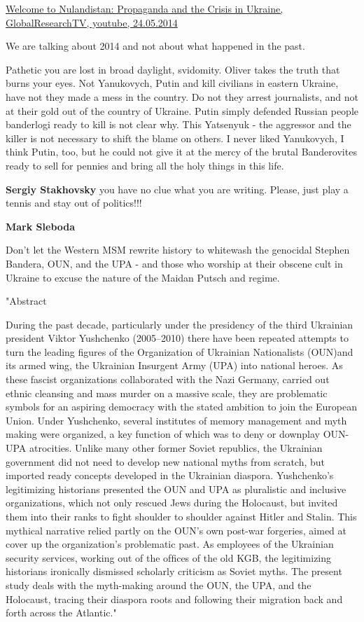 \begin{itemize}
\begin{itemize}
\href{https://www.youtube.com/watch?v=yu8KTiLsLJw}{%
Welcome to Nulandistan: Propaganda and the Crisis in Ukraine, GlobalResearchTV, youtube, 24.05.2014
}

We are talking about
2014 and not about what happened in the past.


Pathetic you are lost in broad daylight, svidomity. Oliver takes the truth that
burns your eyes. Not Yanukovych, Putin and kill civilians in eastern Ukraine,
have not they made a mess in the country. Do not they arrest journalists, and
not at their gold out of the country of Ukraine. Putin simply defended Russian
people banderlogi ready to kill is not clear why. This Yatsenyuk - the
aggressor and the killer is not necessary to shift the blame on others. I never
liked Yanukovych, I think Putin, too, but he could not give it at the mercy of
the brutal Banderovites ready to sell for pennies and bring all the holy things
in this life.

\textbf{Sergiy Stakhovsky} you have no clue what you are writing. Please, just play a tennis and stay out of politics!!!

\textbf{Mark Sleboda}

Don't let the Western MSM rewrite history to whitewash the genocidal Stephen
Bandera, OUN, and the UPA - and those who worship at their obscene cult in
Ukraine to excuse the nature of the Maidan Putsch and regime.

"Abstract

During the past decade, particularly under the presidency of the third
Ukrainian president Viktor Yushchenko (2005–2010) there have been repeated
attempts to turn the leading ﬁgures of the Organization of Ukrainian
Nationalists (OUN)and its armed wing, the Ukrainian Insurgent Army (UPA) into
national heroes. As these fascist organizations collaborated with the Nazi
Germany, carried out ethnic cleansing and mass murder on a massive scale, they
are problematic symbols for an aspiring democracy with the stated ambition to
join the European Union. Under Yushchenko, several institutes of memory
management and myth making were organized, a key function of which was to deny
or downplay OUN-UPA atrocities. Unlike many other former Soviet republics, the
Ukrainian government did not need to develop new national myths from scratch,
but imported ready concepts developed in the Ukrainian diaspora. Yushchenko’s
legitimizing historians presented the OUN and UPA as pluralistic and inclusive
organizations, which not only rescued Jews during the Holocaust, but invited
them into their ranks to ﬁght shoulder to shoulder against Hitler and Stalin.
This mythical narrative relied partly on the OUN’s own post-war forgeries,
aimed at cover up the organization’s problematic past. As employees of the
Ukrainian security services, working out of the ofﬁces of the old KGB, the
legitimizing historians ironically dismissed scholarly criticism as Soviet
myths. The present study deals with the myth-making around the OUN, the UPA,
and the Holocaust, tracing their diaspora roots and following their migration
back and forth across the Atlantic."


\end{itemize}
\end{itemize}
